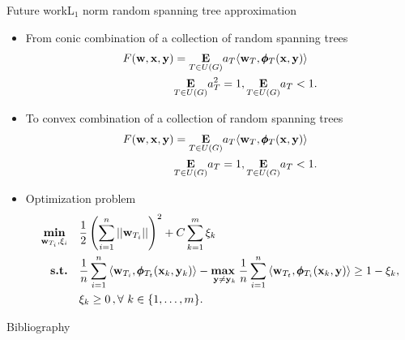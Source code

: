 \documentclass[first=dgreen,second=purple,logo=yellowexc]{aaltoslides}
\begin{document}
%
%
\begin{frame}{Future work}{L$_1$ norm random spanning tree approximation \lonerta}
	\begin{itemize}\footnotesize
		\item From conic combination of a collection of random spanning trees
		\begin{align*}
			F(\mathbf {w},\mathbf {x},\mathbf {y}) &= \underset{T\in U(G)}{\textbf{E}}a_T\langle \mathbf {w}_T, \pmb \phi_T(\mathbf {x},\mathbf {y}) \rangle\\
			  &\underset{T\in U(G)}{\textbf{E}}a_T^2=1,  \underset{T\in U(G)}{\textbf{E}}a_T<1.
		\end{align*}
		\item To convex combination of a collection of random spanning trees
		\begin{align*}
			F(\mathbf {w},\mathbf {x},\mathbf {y}) &= \underset{T\in U(G)}{\textbf{E}}a_T\langle \mathbf {w}_T, \pmb \phi_T(\mathbf {x},\mathbf {y}) \rangle\\
			  &\underset{T\in U(G)}{\textbf{E}}a_T=1,  \underset{T\in U(G)}{\textbf{E}}a_T<1.
		\end{align*}
		\item Optimization problem
		\begin{align*}
			\underset{\mathbf {w}_{T_i},\xi_i}{\textbf{min}} & \quad \frac{1}{2}\left(\sum_{i=1}^{n}\left|\left| \mathbf {w}_{T_i} \right|\right|\right)^2 + C\sum_{k=1}^{m}\xi_k\\
			\textbf{s.t.} & \quad \frac{1}{{n}}\sum_{i=1}^{n}{ \langle \mathbf {w}_{T_i}, \pmb \phi_{T_t}(\mathbf {x}_k,\mathbf {y}_k) \rangle} - \underset{\mathbf {y} \neq \mathbf {y}_k}{\textbf{max}\ } \frac{1}{{n}}\sum_{i=1}^{n}{\langle \mathbf {w}_{T_t}, \pmb \phi_{T_i}(\mathbf {x}_k,\mathbf {y}) \rangle } \geq 1 -  \xi_k, \\
			& \quad \xi_k\ge0\, , \forall\ k \in \{ 1,\dots,m \}.
		\end{align*}
	\end{itemize}
\end{frame}






\begin{frame}[allowframebreaks]{Bibliography}
%

 
\end{frame}
\end{document}
